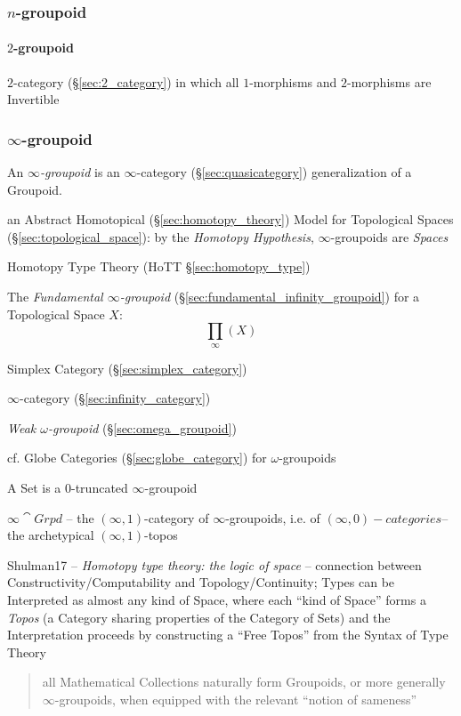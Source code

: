 \subsubsection{$n$-groupoid}\label{sec:n_groupoid}

\paragraph{$2$-groupoid}\label{sec:2_groupoid}\hfill

$2$-category (\S\ref{sec:2_category}) in which all $1$-morphisms and
$2$-morphisms are Invertible



\subsubsection{$\infty$-groupoid}\label{sec:infinity_groupoid}

An \emph{$\infty$-groupoid} is an $\infty$-category (\S\ref{sec:quasicategory})
generalization of a Groupoid.

an Abstract Homotopical (\S\ref{sec:homotopy_theory}) Model for Topological
Spaces (\S\ref{sec:topological_space}): by the \emph{Homotopy Hypothesis},
$\infty$-groupoids are \emph{Spaces}

\fist Homotopy Type Theory (HoTT \S\ref{sec:homotopy_type})

The \emph{Fundamental $\infty$-groupoid}
(\S\ref{sec:fundamental_infinity_groupoid}) for a Topological Space $X$:
\[
  \prod_\infty(X)
\]

Simplex Category (\S\ref{sec:simplex_category})

\fist $\infty$-category (\S\ref{sec:infinity_category})

\emph{Weak $\omega$-groupoid} (\S\ref{sec:omega_groupoid})

\fist cf. Globe Categories (\S\ref{sec:globe_category}) for
$\omega$-groupoids

A Set is a $0$-truncated $\infty$-groupoid %

$\infty\cat{Grpd}$ -- the $(\infty,1)$-category of $\infty$-groupoids,
i.e. of $(\infty,0)-categories$-- the archetypical
$(\infty,1)$-topos %

Shulman17 -- \emph{Homotopy type theory: the logic of space} --
connection between Constructivity/Computability and Topology/Continuity; Types
can be Interpreted as almost any kind of Space, where each ``kind of Space''
forms a \emph{Topos} (a Category sharing properties of the Category of Sets) and
the Interpretation proceeds by constructing a ``Free Topos'' from the Syntax of
Type Theory
\begin{quote}
all Mathematical Collections naturally form Groupoids, or more
generally $\infty$-groupoids, when equipped with the relevant ``notion
of sameness''
\end{quote}



